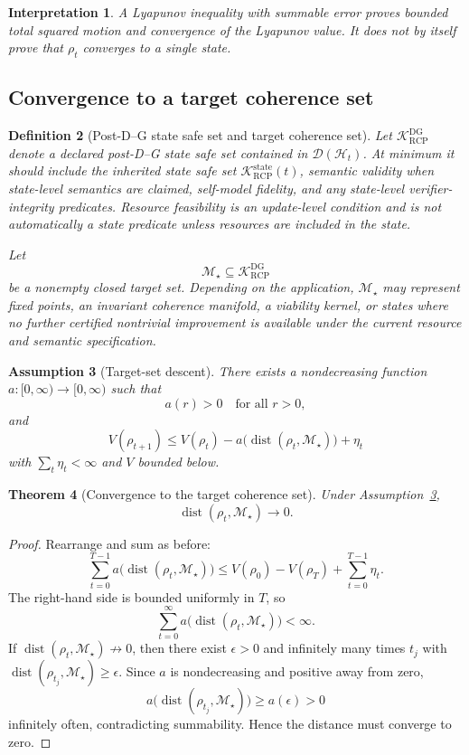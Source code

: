 \documentclass[11pt]{article}
\newtheorem{theorem}{Theorem}[section]
\newtheorem{definition}[theorem]{Definition}
\newtheorem{assumption}[theorem]{Assumption}
\newtheorem{interpretation}[theorem]{Interpretation}
\newcommand{\D}{\mathcal{D}}
\newcommand{\Hcal}{\mathcal{H}}
\newcommand{\K}{\mathcal{K}}
\newcommand{\1}{\mathbf{1}}
\newcommand{\RCP}{\mathrm{RCP}}
\newcommand{\state}{\mathrm{state}}
\providecommand{\Kcal}{\mathcal{K}}
\providecommand{\Mcal}{\mathcal{M}}
\providecommand{\DG}{\mathrm{DG}}
\providecommand{\dist}{\operatorname{dist}}
\begin{document}
\begin{interpretation}
A Lyapunov inequality with summable error proves bounded total squared motion and convergence of the Lyapunov value.  It does not by itself prove that \(\rho_t\) converges to a single state.
\end{interpretation}

\subsection{Convergence to a target coherence set}

\begin{definition}[Post-D--G state safe set and target coherence set]
\label{def:target_coherence_set}
Let \(\Kcal_{\RCP}^{\DG}\) denote a declared post-D--G state safe set contained in \(\D(\Hcal_t)\).  At minimum it should include the inherited state safe set \(\K_{\RCP}^{\state}(t)\), semantic validity when state-level semantics are claimed, self-model fidelity, and any state-level verifier-integrity predicates.  Resource feasibility is an update-level condition and is not automatically a state predicate unless resources are included in the state.

Let
\[
\Mcal_\star\subseteq\Kcal_{\RCP}^{\DG}
\]
be a nonempty closed target set.  Depending on the application, \(\Mcal_\star\) may represent fixed points, an invariant coherence manifold, a viability kernel, or states where no further certified nontrivial improvement is available under the current resource and semantic specification.
\end{definition}

\begin{assumption}[Target-set descent]
\label{ass:target_set_descent}
There exists a nondecreasing function \(a:[0,\infty)\to[0,\infty)\) such that
\[
a(r)>0\quad\text{for all }r>0,
\]
and
\[
V(\rho_{t+1})
\le
V(\rho_t)-a\bigl(\dist(\rho_t,\Mcal_\star)\bigr)+\eta_t
\]
with \(\sum_t\eta_t<\infty\) and \(V\) bounded below.
\end{assumption}

\begin{theorem}[Convergence to the target coherence set]
\label{thm:convergence_to_target_coherence_set}
Under Assumption~\ref{ass:target_set_descent},
\[
\dist(\rho_t,\Mcal_\star)\to0.
\]
\end{theorem}

\begin{proof}
Rearrange and sum as before:
\[
\sum_{t=0}^{T-1}a\bigl(\dist(\rho_t,\Mcal_\star)\bigr)
\le
V(\rho_0)-V(\rho_T)+\sum_{t=0}^{T-1}\eta_t.
\]
The right-hand side is bounded uniformly in \(T\), so
\[
\sum_{t=0}^{\infty}a\bigl(\dist(\rho_t,\Mcal_\star)\bigr)<\infty.
\]
If \(\dist(\rho_t,\Mcal_\star)\not\to0\), then there exist \(\epsilon>0\) and infinitely many times \(t_j\) with \(\dist(\rho_{t_j},\Mcal_\star)\ge\epsilon\).  Since \(a\) is nondecreasing and positive away from zero,
\[
a\bigl(\dist(\rho_{t_j},\Mcal_\star)\bigr)
\ge
a(\epsilon)>0
\]
infinitely often, contradicting summability.  Hence the distance must converge to zero.
\end{proof}
\end{document}
